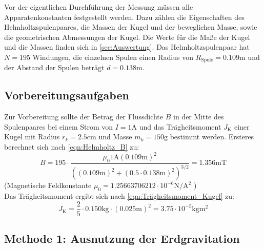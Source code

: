 Vor der eigentlichen Durchführung der Messung müssen alle Apparatenkonstanten festgestellt werden. Dazu zählen die Eigenschaften des Helmholtzspulenpaares, die Massen der 
Kugel und der beweglichen Masse, sowie die geometrischen Abmessungen der Kugel. Die Werte für die Maße der Kugel und die Massen finden sich in \autoref{sec:Auswertung}.
Das Helmholtzspulenpaar hat $N = 195$ Windungen, die einzelnen Spulen einen Radius von $R_{\text{Spule}} = 0.109\unit{\metre}$ und der Abstand der Spulen beträgt
$d = 0.138\unit{\meter}$.

\subsection{Vorbereitungsaufgaben}
\label{subsec:Vorbereitungsaufgaben}

Zur Vorbereitung sollte der Betrag der Flussdichte $B$ in der Mitte des Spulenpaares bei einem Strom von $I = 1\unit{\ampere}$ und das Trägheitsmoment $J_{\text{K}}$
einer Kugel mit Radius $r_k = 2.5\unit{\centi\metre}$ und Masse $m_k = 150\unit{\gram}$ bestimmt werden.
Ersteres berechnet sich nach \autoref{eqn:Helmholtz_B} zu:
\begin{equation*}
    B = 195 \cdot \frac{\mu_0 1\unit{\ampere}(0.109\unit{\metre})^2}{((0.109\unit{\metre})^2 + (0.5 \cdot 0.138\unit{\meter})^2)^{3/2}} = 1.356 \unit{\milli\tesla}
\end{equation*}
(Magnetische Feldkonstante $\mu_0 = 1.25663706212 \cdot 10^{-6} \unit{\newton\per\ampere\squared}$ \cite{scipy}) \\
Das Trägheitsmoment ergibt sich nach \autoref{eqn:Trägheitsmoment_Kugel} zu:
\begin{equation*}
    J_{\text{K}} = \frac{2}{5} \cdot 0.150\unit{\kilogram} \cdot (0.025\unit{\metre})^2 = 3.75 \cdot 10^{-5} \unit{\kilogram\metre\squared} 
\end{equation*}

\subsection{Methode 1: Ausnutzung der Erdgravitation}
\label{subsec:Methode1}

